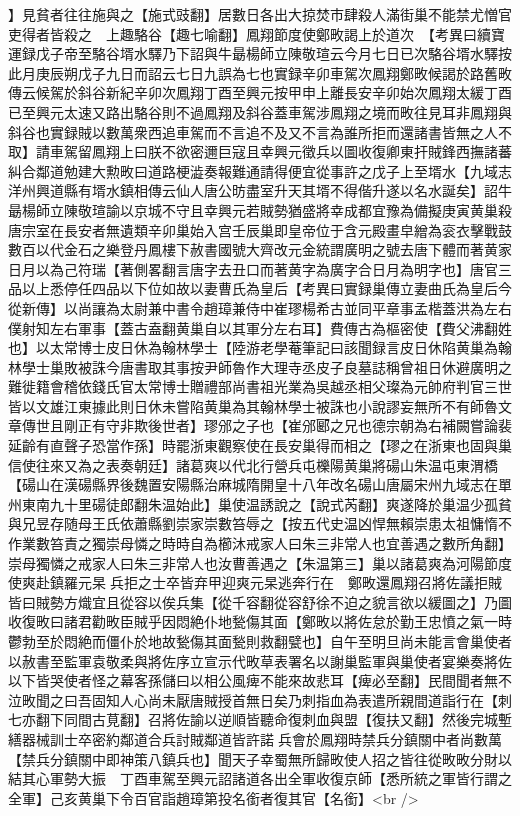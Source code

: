 】見貧者往往施與之【施式豉翻】居數日各出大掠焚市肆殺人滿街巢不能禁尤憎官吏得者皆殺之　上趣駱谷【趣七喻翻】鳳翔節度使鄭畋謁上於道次　【考異曰續寶運録戊子帝至駱谷壻水驛乃下詔與牛朂楊師立陳敬瑄云今月七日已次駱谷壻水驛按此月庚辰朔戊子九日而詔云七日九誤為七也實録辛卯車駕次鳳翔鄭畋候謁於路舊畋傳云候駕於斜谷新紀辛卯次鳳翔丁酉至興元按甲申上離長安辛卯始次鳳翔太緩丁酉已至興元太速又路出駱谷則不過鳳翔及斜谷蓋車駕涉鳳翔之境而畋往見耳非鳳翔與斜谷也實録賊以數萬衆西追車駕而不言追不及又不言為誰所拒而還諸書皆無之人不取】請車駕留鳳翔上曰朕不欲密邇巨寇且幸興元徵兵以圖收復卿東扞賊鋒西撫諸蕃糾合鄰道勉建大勲畋曰道路梗澁奏報難通請得便宜從事許之戊子上至壻水【九域志洋州興道縣有壻水鎮相傳云仙人唐公昉盡室升天其壻不得偕升遂以名水誕矣】詔牛朂楊師立陳敬瑄諭以京城不守且幸興元若賊勢猶盛將幸成都宜豫為備擬庚寅黄巢殺唐宗室在長安者無遺類辛卯巢始入宫壬辰巢即皇帝位于含元殿畫皁繒為衮衣擊戰鼓數百以代金石之樂登丹鳳樓下赦書國號大齊改元金統謂廣明之號去唐下體而著黄家日月以為己符瑞【著側畧翻言唐字去丑口而著黄字為廣字合日月為明字也】唐官三品以上悉停任四品以下位如故以妻曹氏為皇后【考異曰實録巢傳立妻曲氏為皇后今從新傳】以尚讓為太尉兼中書令趙璋兼侍中崔璆楊希古並同平章事孟楷蓋洪為左右僕射知左右軍事【蓋古盍翻黄巢自以其軍分左右耳】費傳古為樞密使【費父沸翻姓也】以太常博士皮日休為翰林學士【陸游老學菴筆記曰該聞録言皮日休陷黄巢為翰林學士巢敗被誅今唐書取其事按尹師魯作大理寺丞皮子良墓誌稱曾祖日休避廣明之難徙籍會稽依錢氏官太常博士贈禮部尚書祖光業為吳越丞相父璨為元帥府判官三世皆以文雄江東據此則日休未嘗陷黄巢為其翰林學士被誅也小說謬妄無所不有師魯文章傳世且剛正有守非欺後世者】璆邠之子也【崔邠郾之兄也德宗朝為右補闕嘗論裴延齡有直聲子恐當作孫】時罷浙東觀察使在長安巢得而相之【璆之在浙東也固與巢信使往來又為之表奏朝廷】諸葛爽以代北行營兵屯櫟陽黄巢將碭山朱温屯東渭橋【碭山在漢碭縣界後魏置安陽縣治麻城隋開皇十八年改名碭山唐屬宋州九域志在單州東南九十里碭徒郎翻朱温始此】巢使温誘說之【說式芮翻】爽遂降於巢温少孤貧與兄昱存随母王氏依蕭縣劉崇家崇數笞辱之【按五代史温凶悍無賴崇患太祖慵惰不作業數笞責之獨崇母憐之時時自為櫛沐戒家人曰朱三非常人也宜善遇之數所角翻】崇母獨憐之戒家人曰朱三非常人也汝曹善遇之【朱温第三】巢以諸葛爽為河陽節度使爽赴鎮羅元杲兵拒之士卒皆弃甲迎爽元杲逃奔行在　鄭畋還鳳翔召將佐議拒賊皆曰賊勢方熾宜且從容以俟兵集【從千容翻從容舒徐不迫之貌言欲以緩圖之】乃圖收復畋曰諸君勸畋臣賊乎因悶絶仆地甃傷其面【鄭畋以將佐怠於勤王忠憤之氣一時鬱勃至於悶絶而僵仆於地故甃傷其面甃則救翻甓也】自午至明旦尚未能言會巢使者以赦書至監軍袁敬柔與將佐序立宣示代畋草表署名以謝巢監軍與巢使者宴樂奏將佐以下皆哭使者怪之幕客孫儲曰以相公風痺不能來故悲耳【痺必至翻】民間聞者無不泣畋聞之曰吾固知人心尚未厭唐賊授首無日矣乃刺指血為表遣所親間道詣行在【刺七亦翻下同間古莧翻】召將佐諭以逆順皆聽命復刺血與盟【復扶又翻】然後完城塹繕器械訓士卒密約鄰道合兵討賊鄰道皆許諾兵會於鳳翔時禁兵分鎮關中者尚數萬【禁兵分鎮關中即神策八鎮兵也】聞天子幸蜀無所歸畋使人招之皆往從畋畋分財以結其心軍勢大振　丁酉車駕至興元詔諸道各出全軍收復京師【悉所統之軍皆行謂之全軍】己亥黄巢下令百官詣趙璋第投名銜者復其官【名銜】<br />
